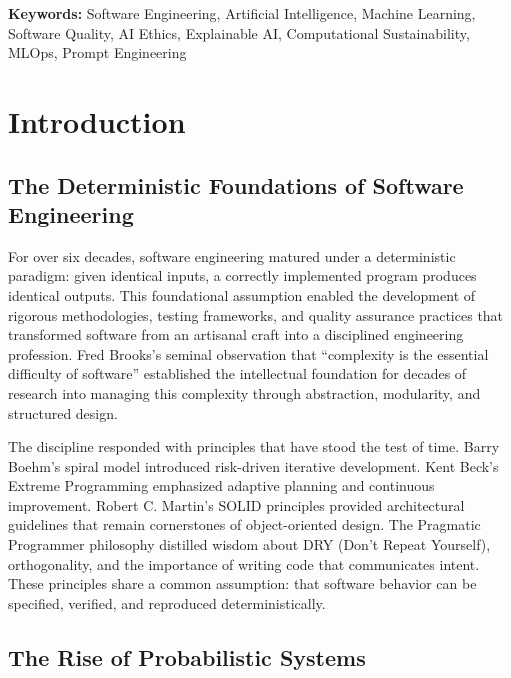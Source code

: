 \documentclass[11pt,a4paper]{article}
\begin{document}
\noindent\textbf{Keywords:} Software Engineering, Artificial Intelligence, Machine Learning, Software Quality, AI Ethics, Explainable AI, Computational Sustainability, MLOps, Prompt Engineering

\vspace{1em}

\section{Introduction}

\subsection{The Deterministic Foundations of Software Engineering}

For over six decades, software engineering matured under a deterministic paradigm: given identical inputs, a correctly implemented program produces identical outputs. This foundational assumption enabled the development of rigorous methodologies, testing frameworks, and quality assurance practices that transformed software from an artisanal craft into a disciplined engineering profession. Fred Brooks's seminal observation that ``complexity is the essential difficulty of software'' \cite{brooks1975mythical} established the intellectual foundation for decades of research into managing this complexity through abstraction, modularity, and structured design.

The discipline responded with principles that have stood the test of time. Barry Boehm's spiral model \cite{boehm1988spiral} introduced risk-driven iterative development. Kent Beck's Extreme Programming \cite{beck2000extreme} emphasized adaptive planning and continuous improvement. Robert C. Martin's SOLID principles \cite{martin2017clean} provided architectural guidelines that remain cornerstones of object-oriented design. The Pragmatic Programmer philosophy \cite{hunt1999pragmatic} distilled wisdom about DRY (Don't Repeat Yourself), orthogonality, and the importance of writing code that communicates intent. These principles share a common assumption: that software behavior can be specified, verified, and reproduced deterministically.


\subsection{The Rise of Probabilistic Systems}
\end{document}
